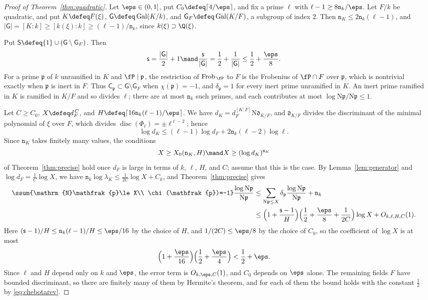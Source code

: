 \documentclass[11pt, reqno, twoside, letterpaper]{amsart}
\DeclareMathOperator{\Gal}{Gal}
\DeclareMathOperator{\Frob}{Frob}
\DeclareMathOperator{\disc}{disc}
\newcommand{\Nm}{\mathrm{N}}
\newcommand{\fp}{\mathfrak{p}}
\newcommand{\fd}{\mathfrak{d}}
\newcommand{\dk}{{\mathtt{n}_k}}
\newcommand{\dK}{{\mathtt{n}_K}}
\newcommand{\auxp}{\ell}
\newcommand{\rou}{\xi}
\newcommand{\wgt}{H}
\newcommand{\expC}{C}
\newcommand{\XX}{X}
\newcommand{\lamK}{\lambda_{\Kf}}
\newcommand{\galKk}{\mathsf{G}}
\newcommand{\Kf}{K}
\newcommand{\wt}{\delta}
\newcommand{\Sset}{\mathsf{S}}
\newcommand{\nS}{\mathsf{s}}
\newcommand{\cls}{\mathsf{C}}
\begin{document}
\begin{proof}[Proof of Theorem~\ref{thm:quadratic}]
Let $\eps\in(0,1]$, put $\expC_0\defeq\lceil 4/\eps\rceil$, and fix a
prime $\auxp$ with $\auxp-1\ge 8\dk/\eps$. Let $F/k$ be quadratic,
and put $\Kf\defeq F(\rou)$, $\galKk\defeq\Gal(\Kf/k)$, and
$\galKk_F\defeq\Gal(\Kf/F)$, a subgroup of index $2$. Then
$\dK\le 2\dk(\auxp-1)$, and
$|\galKk|=[\Kf:k]\ge[k(\rou):k]\ge(\auxp-1)/\dk$, since
$k(\rou)\supset\Q(\rou)$.

Put $\Sset\defeq\{1\}\cup(\galKk\setminus\galKk_F)$. Then
\[
\nS=\frac{|\galKk|}{2}+1\mand
\frac{\nS}{|\galKk|}=\frac12+\frac1{|\galKk|}\le\frac12+\frac{\eps}{8}.
\]
For a prime $\fp$ of $k$ unramified in $\Kf$ and $\fP\mid\fp$, the
restriction of $\Frob_{\,\fP}$ to $F$ is the Frobenius of $\fP\cap F$
over $\fp$, which is nontrivial exactly when $\fp$ is inert in $F$.
Thus $\cls_\fp\subset\galKk\setminus\galKk_F$ when $\chi(\fp)=-1$,
and $\wt_\fp=1$ for every inert prime unramified in $\Kf$. An inert
prime ramified in $\Kf$ is ramified in $\Kf/F$ and so divides
$\auxp$; there are at most $\dk$ such primes, and each contributes at
most $\log\Nm\fp/\Nm\fp\le 1$.

Let $\expC\ge\expC_0$, $\XX\defeq d_F^{\,\expC}$, and
$\wgt\defeq\lceil 16\dk(\auxp-1)/\eps\rceil$. We have
$d_\Kf=d_F^{[\Kf:F]}\Nm\fd_{\Kf/F}$, and $\fd_{\Kf/F}$ divides the
discriminant of the minimal polynomial of $\rou$ over $F$, which
divides $\disc(\Phi_\auxp)=\pm\auxp^{\auxp-2}$; hence
\[
\log d_\Kf\le(\auxp-1)\log d_F+2\dk(\auxp-2)\log\auxp .
\]
Since $\dK$ takes finitely many values, the conditions
\[
\XX\ge\XX_0(\dK,\wgt)\mand\XX\ge(\log d_\Kf)^{\dK}
\]
of Theorem~\ref{thm:precise} hold once $d_F$ is large in terms of
$k$, $\auxp$, $\wgt$, and $\expC$; assume that this is the case. By
Lemma~\ref{lem:generator} and $\log d_F=\frac{1}{\expC}\log\XX$, we
have $\dk\log\lamK\le\frac1{2\expC}\log\XX+C_k$, and
Theorem~\ref{thm:precise} gives
\begin{align*}
\ssum{\Nm\fp\le \XX\\ \chi(\fp)=-1}\frac{\log\Nm\fp}{\Nm\fp}
&\le\sum_{\Nm\fp\le\XX}\wt_\fp\frac{\log\Nm\fp}{\Nm\fp}+\dk\\
&\le\Big(1+\frac{\nS-1}{\wgt}\Big)
\Big(\frac12+\frac{\eps}{8}+\frac1{2\expC}\Big)\log\XX
+O_{k,\auxp,\wgt,\expC}(1).
\end{align*}
Here $(\nS-1)/\wgt\le\dk(\auxp-1)/\wgt\le\eps/16$ by the choice of
$\wgt$, and $1/(2\expC)\le\eps/8$ by the choice of $\expC_0$, so the
coefficient of $\log\XX$ is at most
\[
\Big(1+\frac{\eps}{16}\Big)\Big(\frac12+\frac{\eps}{4}\Big)
<\frac12+\eps .
\]
Since $\auxp$ and $\wgt$ depend only on $k$ and $\eps$, the error
term is $O_{k,\eps,\expC}(1)$, and $\expC_0$ depends on $\eps$ alone.
The remaining fields $F$ have bounded discriminant, so there are
finitely many of them by Hermite's theorem, and for each of them the
bound holds with the constant $\tfrac12$ by \eqref{eq:chebotarev}.
\end{proof}
\end{document}
